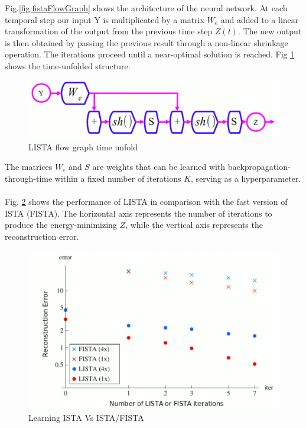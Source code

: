 \documentclass[12pt,letterpaper]{article}
\begin{document}
Fig.\ref{fig:fistaFlowGraph} shows the architecture of the neural network. At each temporal step our input Y is multiplicated by a matrix $W_e$ and added to a linear transformation of the output from the previous time step $Z(t)$. The new output is then obtained by passing the previous result through a non-linear shrinkage operation. The iterations proceed until a near-optimal solution is reached. Fig \ref{fig:fistaFlowGraphTimeUnfold} shows the time-unfolded structure: 

\begin{figure}[H]
  \includegraphics[width=\linewidth]{FISTAFlowGraphTimeUnfold.jpg}
  \caption{LISTA flow graph time unfold}
  \label{fig:fistaFlowGraphTimeUnfold}
\end{figure}

The matrices $W_e$ and $S$ are weights that can be learned with backpropagation-through-time within a fixed number of iterations $K$, serving as a hyperparameter.\\
\\
Fig. \ref{fig:listaFista} shows the performance of LISTA in comparison with the fast version of ISTA (FISTA). The horizontal axis represents the number of iterations to produce the energy-minimizing $Z$, while the vertical axis represents the reconstruction error. 


\begin{figure}[h!]
  \includegraphics[width=\linewidth]{FISTALISTA.jpg}
  \caption{Learning ISTA Vs ISTA/FISTA}
  \label{fig:listaFista}
\end{figure}
\end{document}
